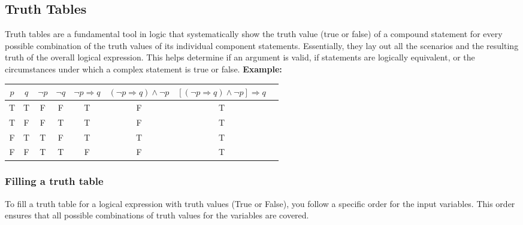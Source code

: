 \subsection{Truth Tables}

Truth tables are a fundamental tool in logic that systematically show the truth value
(true or false) of a compound statement for every possible combination of the truth values of 
its individual component statements.
\newline
Essentially, they lay out all the scenarios and the resulting truth of the overall logical expression.
This helps determine if an argument is valid, if statements are logically equivalent, or the circumstances
under which a complex statement is true or false.
\newline
\textbf{Example:}

\begin{center}
	\begin{tabular}{|c|c|c|c|c|c|c|c|}
		\hline
		\(p\) & \(q\) & \(\neg p\) & \(\neg q\) & \(\neg p \Rightarrow q\) & \((\neg p \Rightarrow q) \land \neg p\) & \(\left[(\neg p \Rightarrow q) \land \neg p\right] \Rightarrow q\) \\
		\hline
		T   & T   & F        & F        & T                      & F                                     & T                                                                \\
		T   & F   & F        & T        & T                      & F                                     & T                                                                \\
		F   & T   & T        & F        & T                      & T                                     & T                                                                \\
		F   & F   & T        & T        & F                      & F                                     & T                                                                \\
		\hline
	\end{tabular}
\end{center}

\subsubsection{Filling a truth table}
To fill a truth table for a logical expression with truth values (True or False), you follow a specific order for the input variables. This order ensures that all possible combinations of truth values for the variables are covered.

